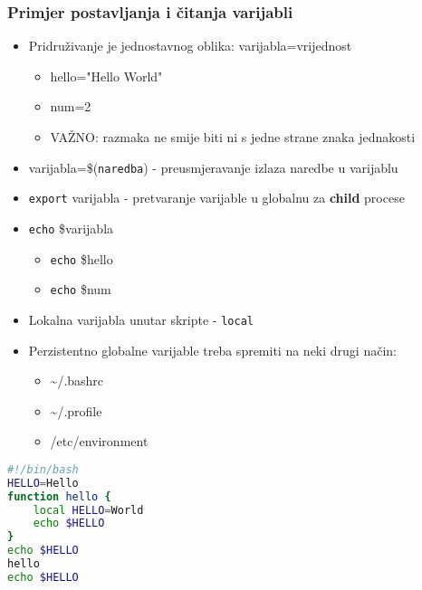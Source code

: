 \documentclass{beamer}
\newcommand{\shell}[1]{\texttt{#1}}
\begin{document}
\begin{frame}[t]
\frametitle{Primjer postavljanja i čitanja varijabli}
\begin{itemize}
	\item Pridruživanje je jednostavnog oblika: varijabla=vrijednost
		 \begin{itemize}
		 	\item hello="Hello World"
		 	\item num=2
		 	\item VAŽNO: razmaka ne smije biti ni s jedne strane znaka jednakosti
		 \end{itemize}
	 \item varijabla=\$(\shell{naredba}) - preusmjeravanje izlaza naredbe u varijablu
	 \item \shell{export} varijabla - pretvaranje varijable u globalnu za \textbf{child} procese
	 \item \shell{echo} \$varijabla
	 	\begin{itemize}
	 		\item \shell{echo}  \$hello
	 		\item \shell{echo}  \$num
	 	\end{itemize}
 	\item Lokalna varijabla unutar skripte - \shell{local}
 	\item Perzistentno globalne varijable treba spremiti na neki drugi način:
 	\begin{itemize}
 		\item \textasciitilde/.bashrc
 		\item \textasciitilde/.profile
 		\item /etc/environment
 	\end{itemize}

\end{itemize}

\end{frame}
\begin{lstlisting}[language=bash]
#!/bin/bash
HELLO=Hello 
function hello {
	local HELLO=World
	echo $HELLO
}
echo $HELLO
hello
echo $HELLO
\end{lstlisting}
\end{document}
